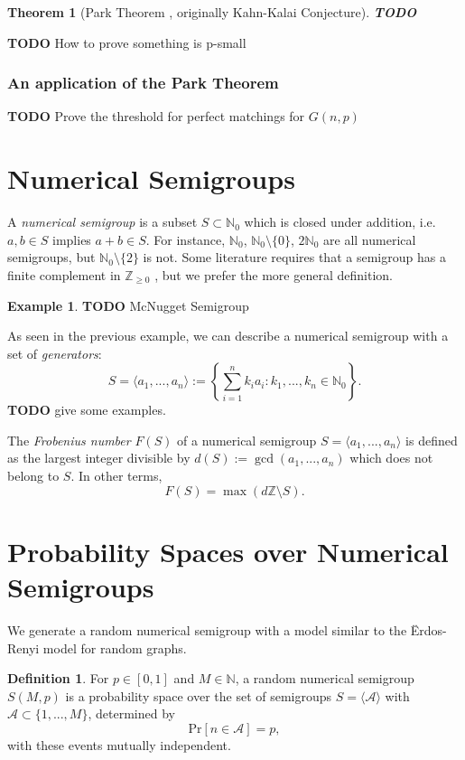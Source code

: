 \documentclass[12pt]{article}
\newtheorem{theorem}{Theorem}[section]
\theoremstyle{definition}
\newtheorem{definition}{Definition}[section]
\newtheorem{exmp}{Example}[section]
\theoremstyle{remark}
\def\NN{\ensuremath{\mathbb{N}}}
\def\ZZ{\ensuremath{\mathbb{Z}}}
\def\Z{\ensuremath{\mathbb{Z}}}
\begin{document}
\begin{theorem}[Park Theorem \cite{park2022proof}, originally Kahn-Kalai Conjecture]
\textbf{TODO}
\end{theorem}

\textbf{TODO} How to prove something is p-small

\subsubsection{An application of the Park Theorem}

\noindent \textbf{TODO} Prove the threshold for perfect matchings for $G(n, p)$

\section{Numerical Semigroups}

A \textit{numerical semigroup} is a subset $S \subset \NN_{0}$ which is closed under addition, i.e. $a, b \in S$ implies $a + b \in S$. For instance, $\NN_0$, $\NN_0 \setminus \{0\}$, $2\NN_0$ are all numerical semigroups, but $\NN_0 \setminus \{2\}$ is not. Some literature requires that a semigroup has a finite complement in $\Z_{\geq 0}$ \cite{chapman2020beyond}, but we prefer the more general definition. 

\begin{exmp} \textbf{TODO}
    McNugget Semigroup
\end{exmp}

As seen in the previous example, we can describe a numerical semigroup with a set of \textit{generators}: 
\[S = \langle a_1, ..., a_n \rangle := \left\{\sum_{i = 1}^n k_ia_i: k_1,...,k_n \in \NN_0\right\}.\] \textbf{TODO} give some examples.

The \textit{Frobenius number} $F(S)$ of a numerical semigroup $S = \langle a_1, ..., a_n \rangle$ is defined as the largest integer divisible by $d(S) := \gcd(a_1, ..., a_n)$ which does not belong to $S$. In other terms, 
\[F(S) = \max (d \ZZ \setminus S).\]

\section{Probability Spaces over Numerical Semigroups}

We generate a random numerical semigroup with a model similar to the Ërdos-Renyi model for random graphs. 

\begin{definition}
    For $p \in [0, 1]$ and $M \in \NN$, a random numerical semigroup $S(M, p)$ is a probability space over the set of semigroups $S = \langle\mathcal{A}\rangle$ with $\mathcal{A} \subset \{1,...,M\}$, determined by
    \[\text{Pr}[n \in \mathcal{A}] = p,\]
    with these events mutually independent.
\end{definition}
\end{document}
